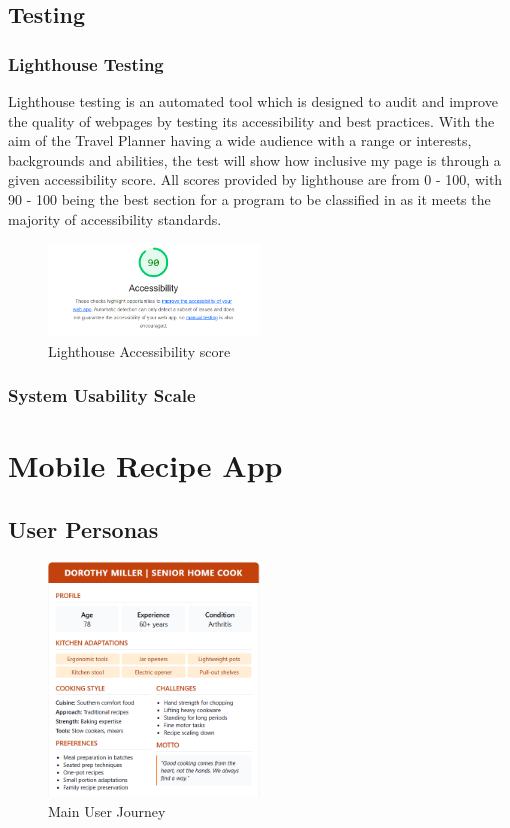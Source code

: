 \documentclass[]{project_final}
\begin{document}
\subsection{Testing}
\subsubsection{Lighthouse Testing}
Lighthouse testing is an automated tool which is designed to audit and improve the quality of webpages by testing its accessibility and best practices. With the aim of the Travel Planner having a wide audience with a range or interests, backgrounds and abilities, the test will show how inclusive my page is through a given accessibility score.
All scores provided by lighthouse are from 0 - 100, with 90 - 100 being the best section for a program to be classified in as it meets the majority of accessibility standards.

\begin{figure}[ht!]
    \centering
    \includegraphics[width=0.5\textwidth]{lighthouse.png}
    \vspace*{0.0cm}
    \caption{Lighthouse Accessibility score}
    \label{fig:1}
\end{figure}

\subsubsection{System Usability Scale}


\section{Mobile Recipe App}
\subsection{User Personas}
\begin{figure}[ht!]
    \centering
    \includegraphics[width=0.5\textwidth]{elderly.png}
    \vspace*{0.0cm}
    \caption{Main User Journey}
    \label{fig:1}
\end{figure}
\end{document}
